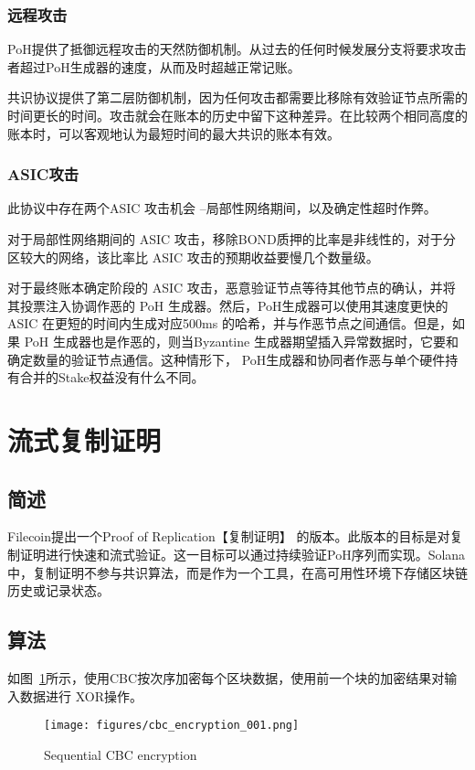 \documentclass[12pt, uft8]{ctexart}
\begin{document}
\subsubsection{远程攻击}\label{censorship}
PoH提供了抵御远程攻击的天然防御机制。从过去的任何时候发展分支将要求攻击者超过PoH生成器的速度，从而及时超越正常记账。

共识协议提供了第二层防御机制，因为任何攻击都需要比移除有效验证节点所需的时间更长的时间。攻击就会在账本的历史中留下这种差异。在比较两个相同高度的账本时，可以客观地认为最短时间的最大共识的账本有效。

\subsubsection{ASIC攻击}\label{censorship}

此协议中存在两个ASIC 攻击机会 –局部性网络期间，以及确定性超时作弊。

对于局部性网络期间的 ASIC 攻击，移除BOND质押的比率是非线性的，对于分区较大的网络，该比率比 ASIC 攻击的预期收益要慢几个数量级。

对于最终账本确定阶段的 ASIC 攻击，恶意验证节点等待其他节点的确认，并将其投票注入协调作恶的 PoH 生成器。然后，PoH生成器可以使用其速度更快的 ASIC 在更短的时间内生成对应500ms 的哈希，并与作恶节点之间通信。但是，如果 PoH 生成器也是作恶的，则当Byzantine 生成器期望插入异常数据时，它要和确定数量的验证节点通信。这种情形下， PoH生成器和协同者作恶与单个硬件持有合并的Stake权益没有什么不同。

\section{流式复制证明}\label{porep}
\subsection{简述}
Filecoin提出一个Proof of Replication【复制证明】 \cite{filecoinporep}的版本。此版本的目标是对复制证明进行快速和流式验证。这一目标可以通过持续验证PoH序列而实现。Solana中，复制证明不参与共识算法，而是作为一个工具，在高可用性环境下存储区块链历史或记录状态。

\subsection{算法}
如图~\ref{fig:encrypt}所示，使用CBC按次序加密每个区块数据，使用前一个块的加密结果对输入数据进行 XOR操作。

\begin{figure}[h]
  \begin{center}
    \centering
    \texttt{[image: figures/cbc\_encryption\_001.png]}
    \caption[Fig 7]{Sequential CBC encryption\label{fig:encrypt}}
  \end{center}
  \end{figure}
\end{document}
